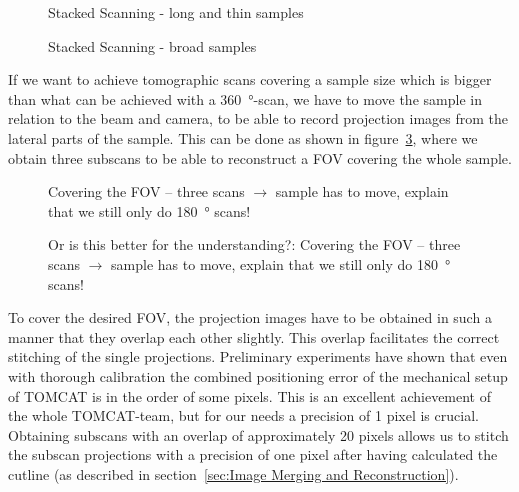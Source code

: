 \begin{figure}
	\centering
	
	\caption{Stacked Scanning - long and thin samples}
	\label{fig:stacked-scanning}
\end{figure}

\begin{figure}
	\centering
	
	\caption{Stacked Scanning - broad samples}
	\label{fig:widefield-scanning}
\end{figure}

If we want to achieve tomographic scans covering a sample size which is bigger than what can be achieved with a \SI{360}{\degree}-scan, we have to move the sample in relation to the beam and camera, to be able to record projection images from the lateral parts of the sample. This can be done as shown in figure~\ref{fig:covering-three scans a},  where we obtain three subscans to be able to reconstruct a FOV covering the whole sample.

\begin{figure}
	\centering
	
	\caption{Covering the FOV -- three scans $\rightarrow$ sample has to move, explain that we still only do \SI{180}{\degree} scans!}
	\label{fig:covering-three scans a}
\end{figure}

\begin{figure}
	\centering
	
	\caption{Or is this better for the understanding?: Covering the FOV -- three scans $\rightarrow$ sample has to move, explain that we still only do \SI{180}{\degree} scans!}
	\label{fig:covering-three scans b}
\end{figure}

To cover the desired FOV, the projection images have to be obtained in such a manner that they overlap each other slightly. This overlap facilitates the correct stitching of the single projections. Preliminary experiments have shown that even with thorough calibration the combined positioning error of the mechanical setup of TOMCAT is in the order of some pixels. This is an excellent achievement of the whole TOMCAT-team, but for our needs a precision of 1 pixel is crucial. Obtaining subscans with an overlap of approximately 20 pixels allows us to stitch the subscan projections with a precision of one pixel after having calculated the cutline (as described in section~\ref{sec:Image Merging and Reconstruction}).

